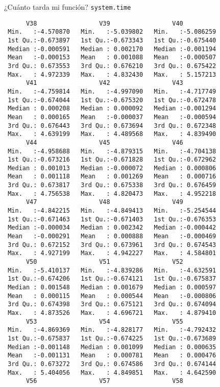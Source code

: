 \documentclass[xcolor={usenames,svgnames,dvipsnames}]{beamer}
\begin{document}
\begin{frame}[label={sec:org4ea8038},fragile]{¿Cuánto tarda mi función? \texttt{system.time}}
\begin{verbatim}
      V38                 V39                 V40           
 Min.   :-4.570870   Min.   :-5.039802   Min.   :-5.086259  
 1st Qu.:-0.673897   1st Qu.:-0.673343   1st Qu.:-0.675440  
 Median :-0.000591   Median : 0.002170   Median :-0.001194  
 Mean   :-0.000153   Mean   : 0.001088   Mean   :-0.000507  
 3rd Qu.: 0.673553   3rd Qu.: 0.676210   3rd Qu.: 0.675422  
 Max.   : 4.972339   Max.   : 4.832430   Max.   : 5.157213  
      V41                 V42                 V43           
 Min.   :-4.759814   Min.   :-4.997090   Min.   :-4.717749  
 1st Qu.:-0.674044   1st Qu.:-0.675320   1st Qu.:-0.672478  
 Median : 0.000208   Median : 0.000092   Median :-0.001294  
 Mean   : 0.000165   Mean   :-0.000037   Mean   :-0.000594  
 3rd Qu.: 0.676443   3rd Qu.: 0.673694   3rd Qu.: 0.672348  
 Max.   : 4.639199   Max.   : 4.489568   Max.   : 4.839490  
      V44                 V45                 V46           
 Min.   :-4.958688   Min.   :-4.879315   Min.   :-4.704138  
 1st Qu.:-0.673216   1st Qu.:-0.671828   1st Qu.:-0.672962  
 Median : 0.001013   Median :-0.000072   Median : 0.000806  
 Mean   : 0.001118   Mean   : 0.001269   Mean   : 0.000716  
 3rd Qu.: 0.673817   3rd Qu.: 0.675338   3rd Qu.: 0.676459  
 Max.   : 4.756538   Max.   : 4.820473   Max.   : 4.952218  
      V47                 V48                 V49           
 Min.   :-4.842215   Min.   :-4.849413   Min.   :-5.254544  
 1st Qu.:-0.671463   1st Qu.:-0.671403   1st Qu.:-0.676353  
 Median :-0.000034   Median : 0.002342   Median :-0.000442  
 Mean   :-0.000291   Mean   : 0.000888   Mean   :-0.000469  
 3rd Qu.: 0.672152   3rd Qu.: 0.673961   3rd Qu.: 0.674543  
 Max.   : 4.927199   Max.   : 4.942227   Max.   : 4.584801  
      V50                 V51                 V52           
 Min.   :-5.410137   Min.   :-4.839286   Min.   :-4.632591  
 1st Qu.:-0.674206   1st Qu.:-0.674121   1st Qu.:-0.675837  
 Median : 0.001548   Median : 0.001679   Median : 0.000597  
 Mean   : 0.000115   Mean   : 0.000544   Mean   :-0.000806  
 3rd Qu.: 0.674398   3rd Qu.: 0.675121   3rd Qu.: 0.674094  
 Max.   : 4.873526   Max.   : 4.696721   Max.   : 4.879410  
      V53                 V54                 V55           
 Min.   :-4.869369   Min.   :-4.828177   Min.   :-4.792432  
 1st Qu.:-0.675837   1st Qu.:-0.674225   1st Qu.:-0.673689  
 Median :-0.001148   Median : 0.001099   Median : 0.000635  
 Mean   :-0.001131   Mean   : 0.000781   Mean   : 0.000476  
 3rd Qu.: 0.673272   3rd Qu.: 0.674586   3rd Qu.: 0.674144  
 Max.   : 5.404056   Max.   : 4.849851   Max.   : 4.642590  
      V56                 V57                 V58           

\end{verbatim}
\end{frame}
\end{document}
